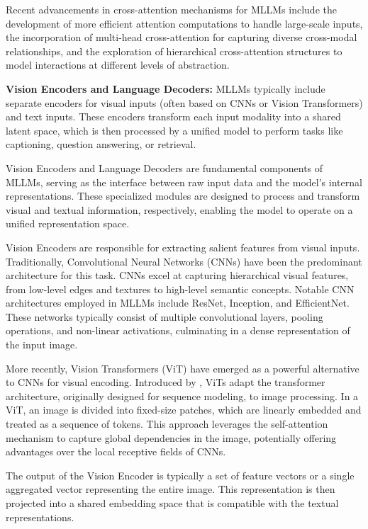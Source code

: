 Recent advancements in cross-attention mechanisms for MLLMs include the development of more efficient attention computations to handle large-scale inputs, the incorporation of multi-head cross-attention for capturing diverse cross-modal relationships, and the exploration of hierarchical cross-attention structures to model interactions at different levels of abstraction.

\textbf{Vision Encoders and Language Decoders:} MLLMs typically include separate encoders for visual inputs (often based on CNNs or Vision Transformers) and text inputs. These encoders transform each input modality into a shared latent space, which is then processed by a unified model to perform tasks like captioning, question answering, or retrieval.

Vision Encoders and Language Decoders are fundamental components of MLLMs, serving as the interface between raw input data and the model's internal representations. These specialized modules are designed to process and transform visual and textual information, respectively, enabling the model to operate on a unified representation space.

Vision Encoders are responsible for extracting salient features from visual inputs. Traditionally, Convolutional Neural Networks (CNNs) have been the predominant architecture for this task. CNNs excel at capturing hierarchical visual features, from low-level edges and textures to high-level semantic concepts. Notable CNN architectures employed in MLLMs include ResNet, Inception, and EfficientNet. These networks typically consist of multiple convolutional layers, pooling operations, and non-linear activations, culminating in a dense representation of the input image.

More recently, Vision Transformers (ViT) have emerged as a powerful alternative to CNNs for visual encoding. Introduced by \cite{dosovitskiy2020image}, ViTs adapt the transformer architecture, originally designed for sequence modeling, to image processing. In a ViT, an image is divided into fixed-size patches, which are linearly embedded and treated as a sequence of tokens. This approach leverages the self-attention mechanism to capture global dependencies in the image, potentially offering advantages over the local receptive fields of CNNs.

The output of the Vision Encoder is typically a set of feature vectors or a single aggregated vector representing the entire image. This representation is then projected into a shared embedding space that is compatible with the textual representations.

